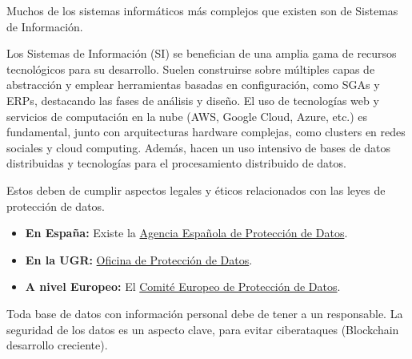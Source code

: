 \documentclass[12pt]{report} %
\providecommand{\tightlist}{%
  \setlength{\itemsep}{0pt}\setlength{\parskip}{0pt}}
\begin{document}
Muchos de los sistemas informáticos más complejos que existen son de
Sistemas de Información.

Los Sistemas de Información (SI) se benefician de una amplia gama de
recursos tecnológicos para su desarrollo. Suelen construirse sobre
múltiples capas de abstracción y emplear herramientas basadas en
configuración, como SGAs y ERPs, destacando las fases de análisis y
diseño. El uso de tecnologías web y servicios de computación en la nube
(AWS, Google Cloud, Azure, etc.) es fundamental, junto con arquitecturas
hardware complejas, como clusters en redes sociales y cloud computing.
Además, hacen un uso intensivo de bases de datos distribuidas y
tecnologías para el procesamiento distribuido de datos.

Estos deben de cumplir aspectos legales y éticos relacionados con las
leyes de protección de datos.

\begin{itemize}
\tightlist
\item
  \textbf{En España:} Existe la \href{https://www.aepd.es/es}{Agencia
  Española de Protección de Datos}.
\item
  \textbf{En la UGR:}
  \href{https://secretariageneral.ugr.es/unidades/oficina-proteccion-datos}{Oficina
  de Protección de Datos}.
\item
  \textbf{A nivel Europeo:} El
  \href{https://edpb.europa.eu/edpb_es}{Comité Europeo de Protección de
  Datos}.
\end{itemize}

Toda base de datos con información personal debe de tener a un
responsable. La seguridad de los datos es un aspecto clave, para evitar
ciberataques (Blockchain desarrollo creciente).

\end{document}
